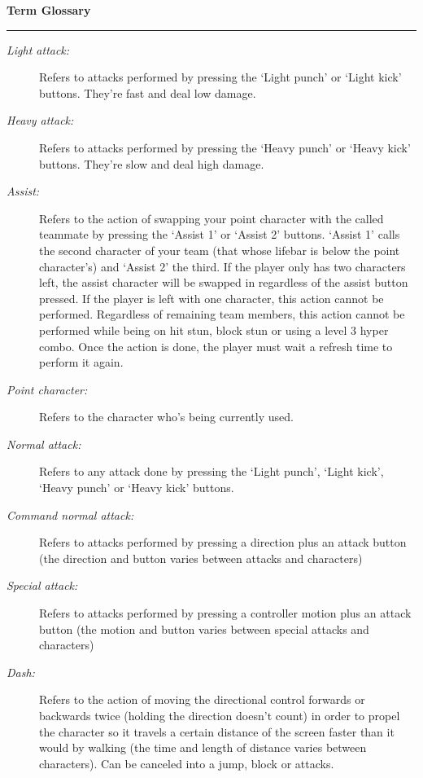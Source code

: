 \documentclass{article}
\begin{document}
\begin{flushleft}

{\LARGE\textbf{Term Glossary}}

\par\rule[0.5em]{18em}{1pt}

\hfill

\begin{description}
\item[\textit{Light attack:}] Refers to attacks performed by pressing the `Light punch' or `Light kick' buttons. They're fast and deal low damage.
\item[\textit{Heavy attack:}] Refers to attacks performed by pressing the `Heavy punch' or `Heavy kick' buttons. They're slow and deal high damage.
\item[\textit{Assist:}] Refers to the action of swapping your point character with the called teammate by pressing the `Assist 1' or `Assist 2' buttons. `Assist 1' calls the second character
of your team (that whose lifebar is below the point character's) and `Assist 2' the third. If the player only has two characters left, the assist character will be swapped in regardless of the assist button pressed. If the player is left with one character, this action cannot be performed. Regardless of remaining team members, this action cannot be performed while being on hit stun, block stun or using a level 3 hyper combo. Once the action is done, the player must wait a refresh time to perform it again.
\item[\textit{Point character:}] Refers to the character who's being currently used.
\item[\textit{Normal attack:}] Refers to any attack done by pressing the `Light punch', `Light kick', `Heavy punch' or `Heavy kick' buttons.
\item[\textit{Command normal attack:}] Refers to attacks performed by pressing a direction plus an attack button (the direction and button varies between attacks and characters) 
\item[\textit{Special attack:}] Refers to attacks performed by pressing a controller motion plus an attack button (the motion and button varies between special attacks and characters)
\item[\textit{Dash:}] Refers to the action of moving the directional control forwards or backwards twice (holding the direction doesn't count) in order to propel the character so it travels a certain distance of the screen faster than it would by walking (the time and length of distance varies between characters). Can be canceled into a jump, block or attacks.

\end{description}
\end{flushleft}
\end{document}
